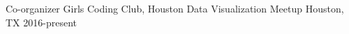 

\begin{cvhonors}

  \cvhonor
    {Co-organizer} %
    {Girls Coding Club, Houston Data Visualization Meetup} %
    {Houston, TX} %
    {2016-present} %


\end{cvhonors}
